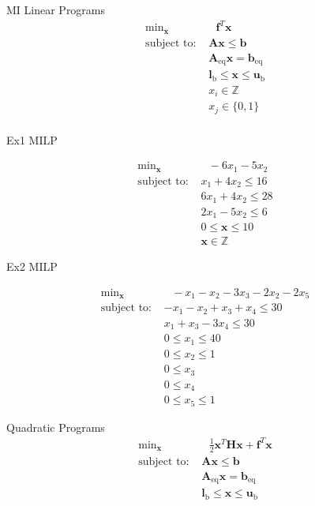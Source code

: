 \documentclass{article}
\begin{document}
MI Linear Programs
\begin{align*}
    \text{min}_{\mathbf{x}}& \text{ } \mathbf{f}^T \mathbf{x} \\
    \mbox{subject to: }& \mathbf{A}\mathbf{x} \le \mathbf{b}\\
                       & \mathbf{A}_{\text{eq}}\mathbf{x} =  \mathbf{b}_{\text{eq}}\\
                       & \mathbf{l}_{\text{b}} \le \mathbf{x} \le \mathbf{u}_{\text{b}}\\
                       & x_i \in \mathbb{Z}\\
                       & x_j \in \{0,1\}\\
\end{align*}

Ex1 MILP

\begin{align*}
    \text{min}_{\mathbf{x}}& \text{ } -6x_1 - 5x_2 \\
    \mbox{subject to: } & x_1 + 4x_2 \le 16\\
                        & 6x_1 + 4x_2 \le 28\\
                        & 2x_1 - 5x_2 \le 6\\
                        & 0 \le \mathbf{x} \le 10\\
                        & \mathbf{x} \in \mathbb{Z}
\end{align*}

Ex2 MILP

\begin{align*}
    \text{min}_{\mathbf{x}}& \text{ } -x_1 - x_2 - 3x_3 - 2x_2 - 2x_5 \\
    \mbox{subject to: } & -x_1 - x_2 + x_3 + x_4 \le 30\\
                        & x_1 + x_3 - 3x_4 \le 30\\
                        & 0 \le x_1 \le 40\\
                        & 0 \le x_2 \le 1\\
                        & 0 \le x_3\\
                        & 0 \le x_4\\
                        & 0 \le x_5 \le 1
\end{align*}

Quadratic Programs
\begin{align*}
    \text{min}_{\mathbf{x}}& \text{ } \frac{1}{2}\mathbf{x}^T \mathbf{H} \mathbf{x} + \mathbf{f}^T \mathbf{x} \\
    \mbox{subject to: }& \mathbf{A}\mathbf{x} \le \mathbf{b}\\
                       & \mathbf{A}_\text{eq}\mathbf{x} = \mathbf{b}_\text{eq}\\
                       & \mathbf{l}_{\text{b}} \le \mathbf{x} \le \mathbf{u}_{\text{b}}\\
\end{align*}
\end{document}
